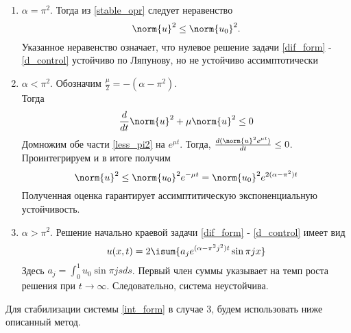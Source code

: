 \begin{enumerate}
\item $\alpha = \pi^2$. Тогда из \eqref{stable_opr} следует неравенство
\begin{equation}
	\norm{u}^2 \le \norm{u_0}^2.
\end{equation}
Указанное неравенство означает, что нулевое решение задачи \eqref{dif_form} - \eqref{d_control} устойчиво по Ляпунову, но не устойчиво ассимптотически
\item $\alpha < \pi^2$. Обозначим $\frac{\mu}{2} = -(\alpha - \pi^2)$.\\
Тогда
\begin{equation}\label{less_pi2}
	\frac{d}{dt}\norm{u}^2 + \mu \norm{u}^2 \le 0
\end{equation}
Домножим обе части \eqref{less_pi2} на $e^{\mu t}$. Тогда, $\frac{d(\norm{u}^2 e^{\mu t})}{dt} \le 0$. Проинтегрируем и в итоге получим
\begin{equation*}
	\norm{u}^2 \le \norm{u_0}^2 e^{-\mu t} = \norm{u_0}^2 e^{2(\alpha - \pi^2) t}
\end{equation*}
Полученная оценка гарантирует ассимптитическую экспоненциальную устойчивость.
\item $\alpha > \pi^2$. Решение начально краевой задачи \eqref{dif_form} - \eqref{d_control} имеет вид
\begin{equation}
	u(x, t) = 2 \isum{a_j e^{(\alpha - \pi^2 j^2)t}\sin{\pi j x}}
\end{equation}
Здесь $a_j = \int_0^1{u_0 \sin{\pi j s} ds}$. Первый член суммы указывает на темп роста решения при $t \rightarrow \infty$. Следовательно, система неустойчива.
\end{enumerate}


Для стабилизации системы \eqref{int_form} в случае 3, будем использовать ниже описанный метод.\\
